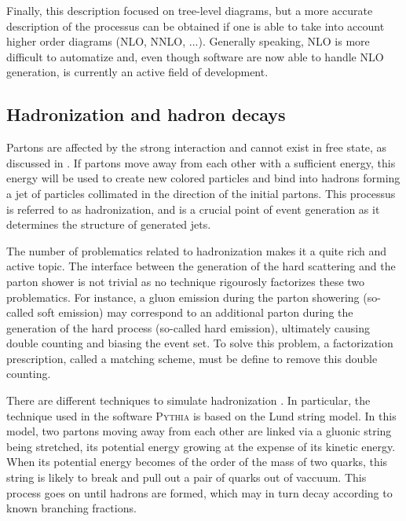             Finally, this description focused on tree-level diagrams, but a more accurate
            description of the processus can be obtained if one is able to take into account higher order
            diagrams (NLO, NNLO, ...). Generally speaking, NLO is more difficult to
            automatize and, even though software are now able to handle NLO generation, is
            currently an active field of development.


            \subsection{Hadronization and hadron decays}

            Partons are affected by the strong interaction and cannot exist in free state, as discussed in
            . If partons move away from each other
            with a sufficient energy, this energy will be used to create new colored
            particles and bind into hadrons forming a jet of particles collimated in the
            direction of the initial partons. This processus is referred to as hadronization,
            and is a crucial point of event generation as it determines the structure
            of generated jets.

            The number of problematics related to hadronization makes it a quite rich and
            active topic. The interface between the generation of the hard scattering
            and the parton shower is not trivial as no technique rigourosly factorizes
            these two problematics. For instance, a gluon emission during
            the parton showering (so-called soft emission) may correspond to an additional
            parton during the generation of the hard process (so-called hard emission),
            ultimately causing double counting and biasing the event set. To solve this
            problem, a factorization prescription, called a matching scheme, must be define
            to remove this double counting.

            There are different techniques to simulate hadronization \cite{MCGenPDG}. In particular, the
            technique used in the software \textsc{Pythia} is based on the Lund string
            model. In this model, two partons moving away from each other are linked
            via a gluonic string being stretched, its potential energy growing at
            the expense of its kinetic energy. When its potential energy becomes of the
            order of the mass of two quarks, this string is likely to break and pull
            out a pair of quarks out of vaccuum. This process goes on until
            hadrons are formed, which may in turn decay according to known branching
            fractions.

